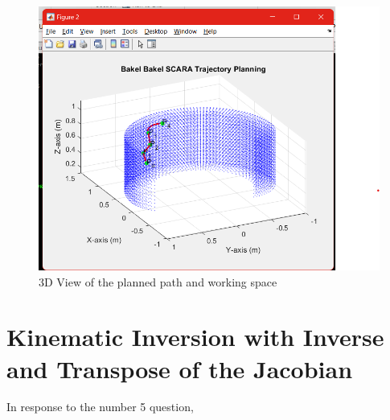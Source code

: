 \documentclass[12pt]{report}
\begin{document}
		\begin{figure}[H]
		\centering
		\includegraphics[scale=0.8]{PW2} %
		\caption{3D View of the planned path and working space}
		\label{run10} %
	\end{figure}
		\chapter{Kinematic Inversion with Inverse and Transpose of the Jacobian}
		
		
		In response to the number 5 question, 
		
\end{document}
